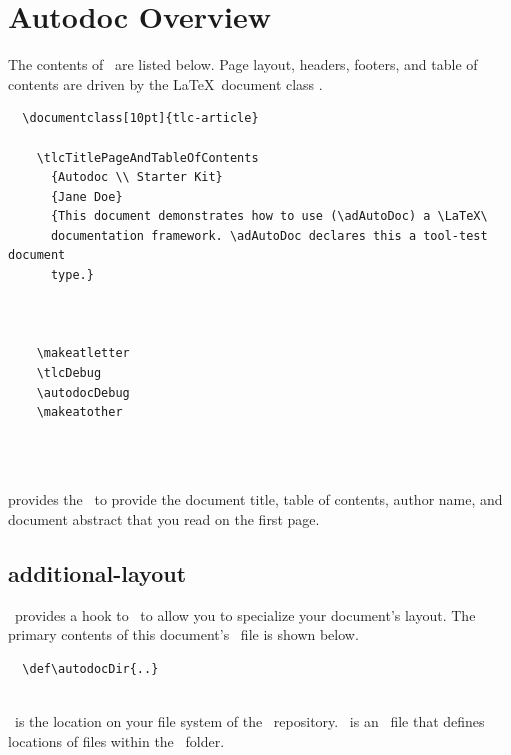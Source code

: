 
\section{Autodoc Overview}

%

The contents of \adStarterkit\ are listed below.  Page layout, headers, footers,
and table of contents are driven by the \LaTeX\ document class \adTlcArticle.

\begin{verbatim}
  \documentclass[10pt]{tlc-article}
  
    \tlcTitlePageAndTableOfContents
      {Autodoc \\ Starter Kit}
      {Jane Doe}
      {This document demonstrates how to use (\adAutoDoc) a \LaTeX\
      documentation framework. \adAutoDoc declares this a tool-test document
      type.}

    

    \makeatletter
    \tlcDebug
    \autodocDebug
    \makeatother

  
\end{verbatim}

\subsection{\adToc}
\textbf{\adTlcArticle} provides the \adToc\ to provide the document title, table
of contents, author name, and document abstract that you read on the first page.

\subsection{additional-layout}
\adTlcArticle\  provides a hook to \adAdditionalLayout\ to allow you to specialize
your document's layout.  The primary contents of this document's
\adAdditionalLayout\ file is shown below.

\begin{verbatim}
  \def\autodocDir{..}
  
\end{verbatim}

\adAutoDocDir\ is the location on your file system of the \adAutoDoc\ repository.
\adProjectDirTex\ is an \adAutoDoc\ file that defines locations of files within
the \adAutoDoc\ folder.

